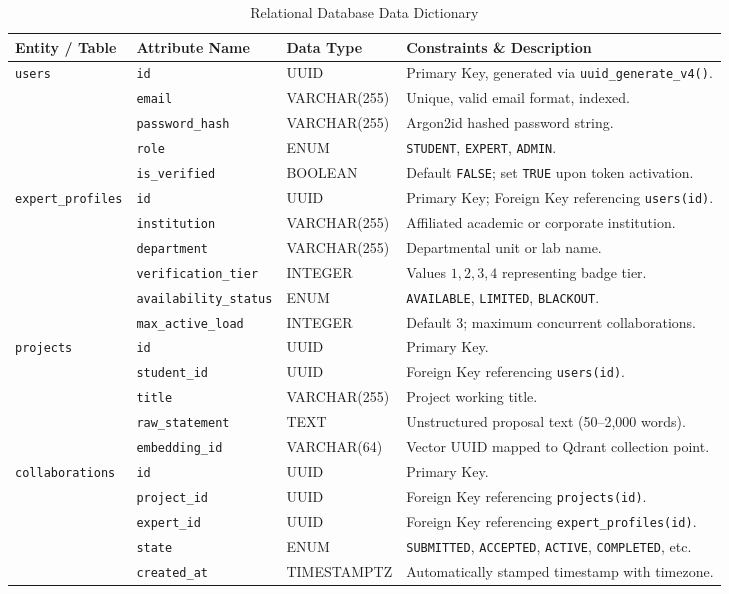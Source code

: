 \documentclass[11pt,a4paper]{article}
\begin{document}
\begin{table}[H]
\centering
\small
\caption{Relational Database Data Dictionary}
\label{tab:data_dict}
\begin{tabularx}{\textwidth}{@{}l l l X@{}}
\toprule
\textbf{Entity / Table} & \textbf{Attribute Name} & \textbf{Data Type} & \textbf{Constraints \& Description} \\
\midrule
\texttt{users} & \texttt{id} & UUID & Primary Key, generated via \texttt{uuid\_generate\_v4()}. \\
& \texttt{email} & VARCHAR(255) & Unique, valid email format, indexed. \\
& \texttt{password\_hash} & VARCHAR(255) & Argon2id hashed password string. \\
& \texttt{role} & ENUM & \texttt{STUDENT}, \texttt{EXPERT}, \texttt{ADMIN}. \\
& \texttt{is\_verified} & BOOLEAN & Default \texttt{FALSE}; set \texttt{TRUE} upon token activation. \\
\addlinespace
\texttt{expert\_profiles} & \texttt{id} & UUID & Primary Key; Foreign Key referencing \texttt{users(id)}. \\
& \texttt{institution} & VARCHAR(255) & Affiliated academic or corporate institution. \\
& \texttt{department} & VARCHAR(255) & Departmental unit or lab name. \\
& \texttt{verification\_tier} & INTEGER & Values $1, 2, 3, 4$ representing badge tier. \\
& \texttt{availability\_status} & ENUM & \texttt{AVAILABLE}, \texttt{LIMITED}, \texttt{BLACKOUT}. \\
& \texttt{max\_active\_load} & INTEGER & Default 3; maximum concurrent collaborations. \\
\addlinespace
\texttt{projects} & \texttt{id} & UUID & Primary Key. \\
& \texttt{student\_id} & UUID & Foreign Key referencing \texttt{users(id)}. \\
& \texttt{title} & VARCHAR(255) & Project working title. \\
& \texttt{raw\_statement} & TEXT & Unstructured proposal text (50--2,000 words). \\
& \texttt{embedding\_id} & VARCHAR(64) & Vector UUID mapped to Qdrant collection point. \\
\addlinespace
\texttt{collaborations} & \texttt{id} & UUID & Primary Key. \\
& \texttt{project\_id} & UUID & Foreign Key referencing \texttt{projects(id)}. \\
& \texttt{expert\_id} & UUID & Foreign Key referencing \texttt{expert\_profiles(id)}. \\
& \texttt{state} & ENUM & \texttt{SUBMITTED}, \texttt{ACCEPTED}, \texttt{ACTIVE}, \texttt{COMPLETED}, etc. \\
& \texttt{created\_at} & TIMESTAMPTZ & Automatically stamped timestamp with timezone. \\
\bottomrule
\end{tabularx}
\end{table}
\end{document}
